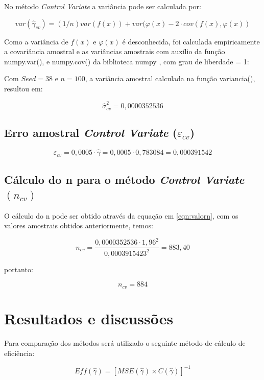 \documentclass{article}
\begin{document}
No método \textit{Control Variate} a variância pode ser calculada por:

\begin{equation*}
    var(\hat{\gamma}_{cv}) = (1/n) var(f(x))+var(\varphi(x) - 2\cdot cov(f(x), \varphi(x))
\end{equation*}

Como a variância de $f(x)$ e $\varphi(x)$ é desconhecida, foi calculada empiricamente a covariância amostral e as variâncias amostrais com auxílio da função numpy.var(), e numpy.cov() da biblioteca numpy \cite{harris2020array}, com grau de liberdade = 1:

Com $Seed=38$ e $n=100$, a variância amostral calculada na função variancia(), resultou em:

\[
    \hat{\sigma}_{cv}^2 = 0,0000352536
\]

\subsection{Erro amostral \textit{Control Variate} ($\varepsilon_{cv}$)}

\begin{equation*}
    \varepsilon_{cv} = 0,0005\cdot\hat{\gamma} = 0,0005\cdot0,783084 = 0,000391542
\end{equation*}

\subsection{Cálculo do n para o método \textit{Control Variate} $(n_{cv})$}

O cálculo do n pode ser obtido através da equação em \ref{eqn:valorn}, com os valores amostrais obtidos anteriormente, temos:

\begin{equation*}
    n_{cv} = \frac{0,0000352536\cdot1,96^2}{0,0003915423^2} = 883,40
\end{equation*}

portanto:

\[
    n_{cv} = 884
\]


\section{Resultados e discussões}

Para comparação dos métodos será utilizado o seguinte método de cálculo de eficiência: \cite{MCandQMCsampling}

\begin{equation*}
    Eff(\hat{\gamma}) = [MSE(\hat{\gamma}) \times C(\hat{\gamma})]^{-1} 
\end{equation*}
\end{document}
